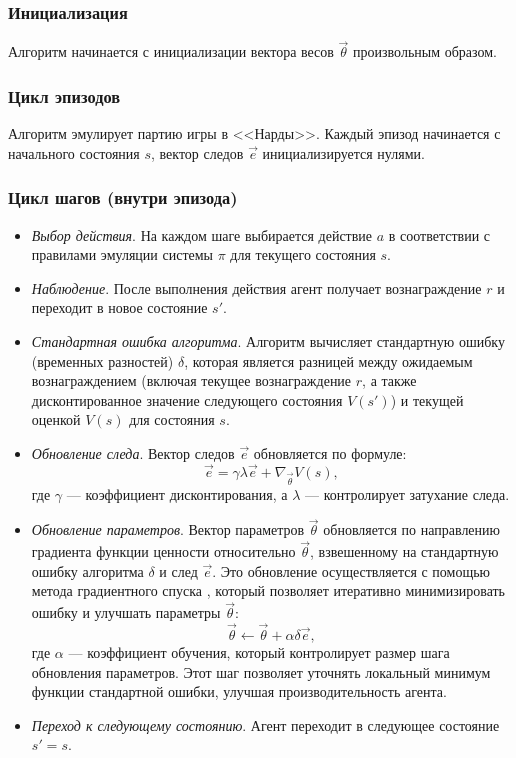 
\subsubsection{Инициализация}
Алгоритм начинается с инициализации вектора весов $\vec{\theta}$ произвольным образом.

\subsubsection{Цикл эпизодов}
Алгоритм эмулирует партию игры в <<Нарды>>. Каждый эпизод начинается с начального состояния $s$, вектор следов $\vec{e}$ инициализируется нулями.

\subsubsection{Цикл шагов (внутри эпизода)}
\begin{itemize}
    \item \textit{Выбор действия}. На каждом шаге выбирается действие $a$ в соответствии с правилами эмуляции системы $\pi$ для текущего состояния $s$.
    \item \textit{Наблюдение}. После выполнения действия агент получает вознаграждение $r$ и переходит в новое состояние $s'$.
    \item \textit{Стандартная ошибка алгоритма}. Алгоритм вычисляет стандартную ошибку (временных разностей) $\delta$, которая является разницей между ожидаемым вознаграждением (включая текущее вознаграждение $r$, а также дисконтированное значение следующего состояния $V(s')$) и текущей оценкой $V(s)$ для состояния $s$.
    \item \textit{Обновление следа}. Вектор следов $\vec{e}$ обновляется по формуле:
    \begin{equation}
        \vec{e} = \gamma \lambda \vec{e} + \nabla_{\vec{\theta}} V(s),
    \end{equation}
    где $\gamma$ --- коэффициент дисконтирования, а $\lambda$ --- контролирует затухание следа.
    \item \textit{Обновление параметров}. Вектор параметров $\vec{\theta}$ обновляется по направлению градиента функции ценности относительно $\vec{\theta}$, взвешенному на стандартную ошибку алгоритма $\delta$ и след $\vec{e}$. Это обновление осуществляется с помощью метода градиентного спуска \cite{gradient-descent}, который позволяет итеративно минимизировать ошибку и улучшать параметры $\vec{\theta}$:
    \begin{equation}
        \vec{\theta} \gets \vec{\theta} + \alpha \delta \vec{e},
    \end{equation}
    где $\alpha$ --- коэффициент обучения, который контролирует размер шага обновления параметров. Этот шаг позволяет уточнять локальный минимум функции стандартной ошибки, улучшая производительность агента.
    \item \textit{Переход к следующему состоянию}. Агент переходит в следующее состояние $s' = s$.
    \end{itemize}

